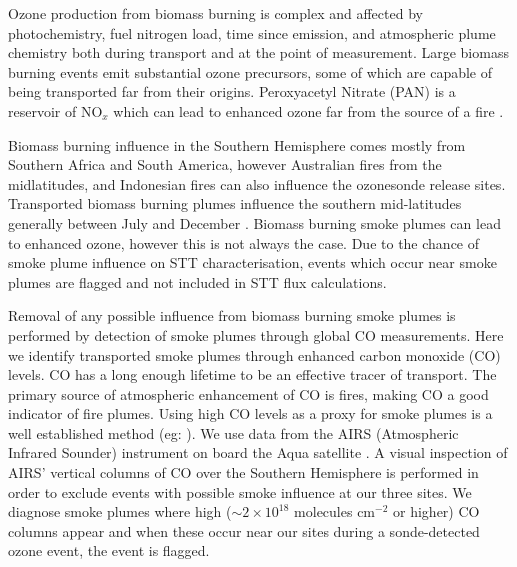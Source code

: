 \documentclass{article}
\begin{document}
    Ozone production from biomass burning is complex and affected by photochemistry, fuel nitrogen load, time since emission, and atmospheric plume chemistry both during transport and at the point of measurement.
    Large biomass burning events emit substantial ozone precursors, some of which are capable of being transported far from their origins. 
    Peroxyacetyl Nitrate (PAN) is a reservoir of NO$_x$ which can lead to enhanced ozone far from the source of a fire \citep{Jaffe_2012}.
    
    Biomass burning influence in the Southern Hemisphere comes mostly from Southern Africa and South America, however Australian fires from the midlatitudes, and Indonesian fires can also influence the ozonesonde release sites.
    Transported biomass burning plumes influence the southern mid-latitudes generally between July and December \citep{Pak2003}.
    Biomass burning smoke plumes can lead to enhanced ozone, however this is not always the case.
    Due to the chance of smoke plume influence on STT characterisation, events which occur near smoke plumes are flagged and not included in STT flux calculations.
    
    Removal of any possible influence from biomass burning smoke plumes is performed by detection of smoke plumes through global CO measurements.
    Here we identify transported smoke plumes through enhanced carbon monoxide (CO) levels.
    CO has a long enough lifetime to be an effective tracer of transport.
    The primary source of atmospheric enhancement of CO is fires, making CO a good indicator of fire plumes.
    Using high CO levels as a proxy for smoke plumes is a well established method (eg: \citet{Edwards2003,Sinha2004,Edwards2006,Mari2008}).
    We use data from the AIRS (Atmospheric Infrared Sounder) instrument on board the Aqua satellite \citep{AIRS3STD}.
    A visual inspection of AIRS' vertical columns of CO over the Southern Hemisphere is performed in order to exclude events with possible smoke influence at our three sites.
    We diagnose smoke plumes where high ($\sim 2 \times 10^{18}$ molecules cm$^{-2}$ or higher) CO columns appear and when these occur near our sites during a sonde-detected ozone event, the event is flagged.
\end{document}
